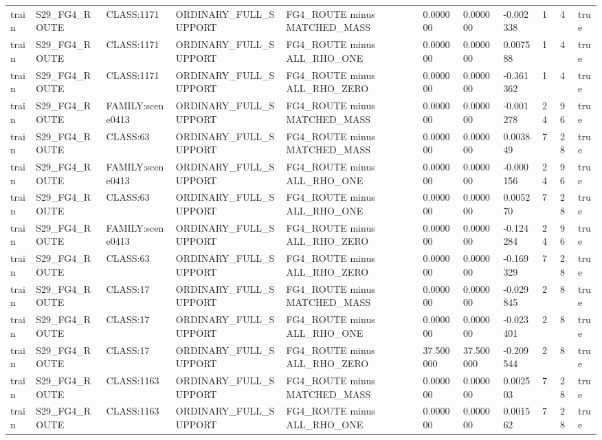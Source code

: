 \begin{tabular}{lllllllllll}
train & S29\_FG4\_ROUTE & CLASS:1171 & ORDINARY\_FULL\_SUPPORT & FG4\_ROUTE minus MATCHED\_MASS & 0.000000 & 0.000000 & -0.002338 & 1 & 4 & true \\
train & S29\_FG4\_ROUTE & CLASS:1171 & ORDINARY\_FULL\_SUPPORT & FG4\_ROUTE minus ALL\_RHO\_ONE & 0.000000 & 0.000000 & 0.007588 & 1 & 4 & true \\
train & S29\_FG4\_ROUTE & CLASS:1171 & ORDINARY\_FULL\_SUPPORT & FG4\_ROUTE minus ALL\_RHO\_ZERO & 0.000000 & 0.000000 & -0.361362 & 1 & 4 & true \\
train & S29\_FG4\_ROUTE & FAMILY:scene0413 & ORDINARY\_FULL\_SUPPORT & FG4\_ROUTE minus MATCHED\_MASS & 0.000000 & 0.000000 & -0.001278 & 24 & 96 & true \\
train & S29\_FG4\_ROUTE & CLASS:63 & ORDINARY\_FULL\_SUPPORT & FG4\_ROUTE minus MATCHED\_MASS & 0.000000 & 0.000000 & 0.003849 & 7 & 28 & true \\
train & S29\_FG4\_ROUTE & FAMILY:scene0413 & ORDINARY\_FULL\_SUPPORT & FG4\_ROUTE minus ALL\_RHO\_ONE & 0.000000 & 0.000000 & -0.000156 & 24 & 96 & true \\
train & S29\_FG4\_ROUTE & CLASS:63 & ORDINARY\_FULL\_SUPPORT & FG4\_ROUTE minus ALL\_RHO\_ONE & 0.000000 & 0.000000 & 0.005270 & 7 & 28 & true \\
train & S29\_FG4\_ROUTE & FAMILY:scene0413 & ORDINARY\_FULL\_SUPPORT & FG4\_ROUTE minus ALL\_RHO\_ZERO & 0.000000 & 0.000000 & -0.124284 & 24 & 96 & true \\
train & S29\_FG4\_ROUTE & CLASS:63 & ORDINARY\_FULL\_SUPPORT & FG4\_ROUTE minus ALL\_RHO\_ZERO & 0.000000 & 0.000000 & -0.169329 & 7 & 28 & true \\
train & S29\_FG4\_ROUTE & CLASS:17 & ORDINARY\_FULL\_SUPPORT & FG4\_ROUTE minus MATCHED\_MASS & 0.000000 & 0.000000 & -0.029845 & 2 & 8 & true \\
train & S29\_FG4\_ROUTE & CLASS:17 & ORDINARY\_FULL\_SUPPORT & FG4\_ROUTE minus ALL\_RHO\_ONE & 0.000000 & 0.000000 & -0.023401 & 2 & 8 & true \\
train & S29\_FG4\_ROUTE & CLASS:17 & ORDINARY\_FULL\_SUPPORT & FG4\_ROUTE minus ALL\_RHO\_ZERO & 37.500000 & 37.500000 & -0.209544 & 2 & 8 & true \\
train & S29\_FG4\_ROUTE & CLASS:1163 & ORDINARY\_FULL\_SUPPORT & FG4\_ROUTE minus MATCHED\_MASS & 0.000000 & 0.000000 & 0.002503 & 7 & 28 & true \\
train & S29\_FG4\_ROUTE & CLASS:1163 & ORDINARY\_FULL\_SUPPORT & FG4\_ROUTE minus ALL\_RHO\_ONE & 0.000000 & 0.000000 & 0.001562 & 7 & 28 & true \\

\end{tabular}

